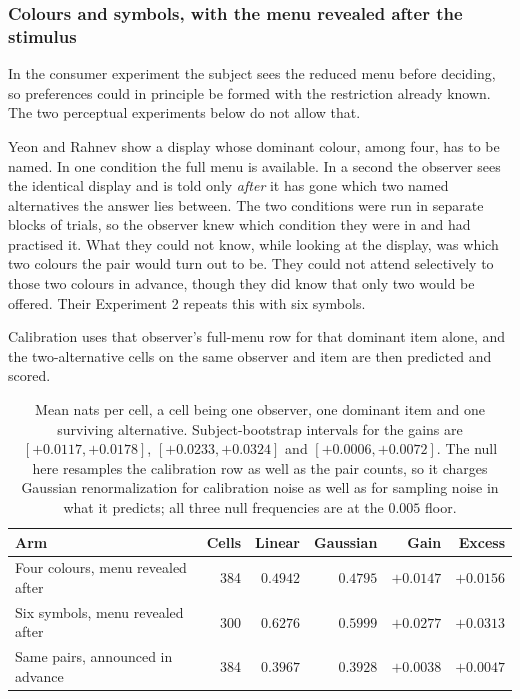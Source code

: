 \documentclass[11pt]{article}
\theoremstyle{italichead}
\begin{document}
\subsubsection{Colours and symbols, with the menu revealed after the stimulus}
\label{sec:after}

In the consumer experiment the subject sees the reduced menu before deciding, so preferences
could in principle be formed with the restriction already known. The two perceptual experiments
below do not allow that.

Yeon and Rahnev \cite{yeonrahnev2020} show a display whose dominant colour, among four, has
to be named. In one condition the full menu is available. In a second the observer sees the
identical display and is told only \emph{after} it has gone which two named alternatives the
answer lies between. The two conditions were run in separate blocks of trials, so the observer
knew which condition they were in and had practised it. What they could not know, while looking
at the display, was which two colours the pair would turn out to be. They could not attend
selectively to those two colours in advance, though they did know that only two would be
offered. Their Experiment 2 repeats this with six symbols.

Calibration uses that observer's full-menu row for that dominant item alone, and the
two-alternative cells on the same observer and item are then predicted and scored.

\begin{table}[htbp]
\centering
\small
\begin{tabular}{lrrrrr}
\toprule
Arm & Cells & Linear & Gaussian & Gain & Excess \\
\midrule
Four colours, menu revealed after & 384 & $0.4942$ & $0.4795$ & $+0.0147$ & $+0.0156$ \\
Six symbols, menu revealed after & 300 & $0.6276$ & $0.5999$ & $+0.0277$ & $+0.0313$ \\
\midrule
Same pairs, announced in advance & 384 & $0.3967$ & $0.3928$ & $+0.0038$ & $+0.0047$ \\
\bottomrule
\end{tabular}
\caption{Mean nats per cell, a cell being one observer, one dominant item and one surviving
alternative. Subject-bootstrap intervals for the gains are $[+0.0117, +0.0178]$,
$[+0.0233, +0.0324]$ and $[+0.0006, +0.0072]$. The null here resamples the calibration row
as well as the pair counts, so it charges Gaussian renormalization for calibration noise as well as for
sampling noise in what it predicts; all three null frequencies are at the $0.005$ floor.}
\label{tab:after}
\end{table}
\end{document}
